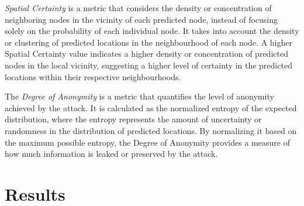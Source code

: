 \documentclass[conference]{IEEEtran}
\begin{document}
\textit{Spatial Certainty} is a metric that considers the density or concentration of
neighboring nodes in the vicinity of each predicted node, instead of focusing
solely on the probability of each individual node. It takes into account the
density or clustering of predicted locations in the neighbourhood of each node.
A higher Spatial Certainty value indicates a higher density or concentration of
predicted nodes in the local vicinity, suggesting a higher level of certainty
in the predicted locations within their respective neighbourhoods.

The \textit{Degree of Anonymity} is a metric that quantifies the level of
anonymity achieved by the attack. It is calculated as the normalized entropy of
the expected distribution, where the entropy represents the amount of
uncertainty or randomness in the distribution of predicted locations. By
normalizing it based on the maximum possible entropy, the Degree of Anonymity
provides a measure of how much information is leaked or preserved by the
attack.

\section{\textbf{Results}}
\end{document}
